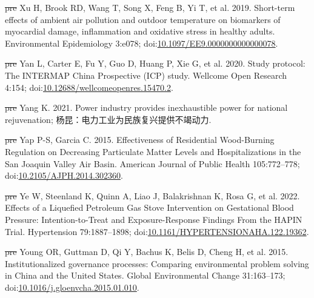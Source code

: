 \documentclass[
  letterpaper,
  DIV=11,
  numbers=noendperiod]{scrartcl}
\newlength{\cslhangindent}
\newenvironment{CSLReferences}[2] %
 {\begin{list}{}{%
  \setlength{\itemindent}{0pt} %
  \setlength{\leftmargin}{0pt} %
  \setlength{\parsep}{0pt} %
  \ifodd #1
   \setlength{\leftmargin}{\cslhangindent} %
   \setlength{\itemindent}{-1\cslhangindent} %
  \fi
  \setlength{\itemsep}{#2\baselineskip}}} %
 {\end{list}} %
\providecommand{\DIFdeltex}[1]{{\protect\color{red}\sout{#1}}}                      %
\providecommand{\DIFaddbegin}{} %
\providecommand{\DIFaddend}{} %
\providecommand{\DIFdelbegin}{} %
\providecommand{\DIFdelend}{} %
\providecommand{\DIFdel}[1]{\texorpdfstring{\DIFdeltex{#1}}{}} %
\newcommand{\DIFscaledelfig}{0.5}
\newlength{\DIFdelgraphicswidth} %
\newlength{\DIFdelgraphicsheight} %
\newcommand{\DIFaddincludegraphics}[2][]{{\color{blue}\fbox{\DIFOincludegraphics[#1]{#2}}}} %
\newcommand{\DIFdelincludegraphics}[2][]{%
\sbox{\DIFdelgraphicsbox}{\DIFOincludegraphics[#1]{#2}}%
\settoboxwidth{\DIFdelgraphicswidth}{\DIFdelgraphicsbox} %
\settoboxtotalheight{\DIFdelgraphicsheight}{\DIFdelgraphicsbox} %
\scalebox{\DIFscaledelfig}{%
\parbox[b]{\DIFdelgraphicswidth}{\usebox{\DIFdelgraphicsbox}\\[-\baselineskip] \rule{\DIFdelgraphicswidth}{0em}}\llap{\resizebox{\DIFdelgraphicswidth}{\DIFdelgraphicsheight}{%
\setlength{\unitlength}{\DIFdelgraphicswidth}%
\begin{picture}(1,1)%
\thicklines\linethickness{2pt} %
{\color[rgb]{1,0,0}\put(0,0){\framebox(1,1){}}}%
{\color[rgb]{1,0,0}\put(0,0){\line( 1,1){1}}}%
{\color[rgb]{1,0,0}\put(0,1){\line(1,-1){1}}}%
\end{picture}%
}\hspace*{3pt}}} %
} %
\DeclareRobustCommand{\DIFaddbegin}{\DIFOaddbegin \let\includegraphics\DIFaddincludegraphics} %
\DeclareRobustCommand{\DIFaddend}{\DIFOaddend \let\includegraphics\DIFOincludegraphics} %
\DeclareRobustCommand{\DIFdelbegin}{\DIFOdelbegin \let\includegraphics\DIFdelincludegraphics} %
\DeclareRobustCommand{\DIFdelend}{\DIFOaddend \let\includegraphics\DIFOincludegraphics} %
\begin{document}
\begin{CSLReferences}{1}{1}
\DIFdelbegin %
\DIFdel{pre}%
\DIFdelend \DIFaddbegin {}
\DIFaddend Xu H, Brook RD, Wang T, Song X, Feng B, Yi T, et al. 2019. Short-term
effects of ambient air pollution and outdoor temperature on biomarkers
of myocardial damage, inflammation and oxidative stress in healthy
adults. Environmental Epidemiology 3:e078;
doi:\href{https://doi.org/10.1097/EE9.0000000000000078}{10.1097/EE9.0000000000000078}.

\DIFdelbegin %
\DIFdel{pre}%
\DIFdelend \DIFaddbegin {}
\DIFaddend Yan L, Carter E, Fu Y, Guo D, Huang P, Xie G, et al. 2020. Study
protocol: {The INTERMAP China Prospective} ({ICP}) study. Wellcome Open
Research 4:154;
doi:\href{https://doi.org/10.12688/wellcomeopenres.15470.2}{10.12688/wellcomeopenres.15470.2}.

\DIFdelbegin %
\DIFdel{pre}%
\DIFdelend \DIFaddbegin {}
\DIFaddend Yang K. 2021. Power industry provides inexhaustible power for national
rejuvenation; 杨昆：电力工业为民族复兴提供不竭动力.

\DIFdelbegin %
\DIFdel{pre}%
\DIFdelend \DIFaddbegin {}
\DIFaddend Yap P-S, Garcia C. 2015. Effectiveness of {Residential Wood-Burning
Regulation} on {Decreasing Particulate Matter Levels} and
{Hospitalizations} in the {San Joaquin Valley Air Basin}. American
Journal of Public Health 105:772--778;
doi:\href{https://doi.org/10.2105/AJPH.2014.302360}{10.2105/AJPH.2014.302360}.

\DIFdelbegin %
\DIFdel{pre}%
\DIFdelend \DIFaddbegin {}
\DIFaddend Ye W, Steenland K, Quinn A, Liao J, Balakrishnan K, Rosa G, et al. 2022.
Effects of a {Liquefied Petroleum Gas Stove Intervention} on
{Gestational Blood Pressure}: {Intention-to-Treat} and
{Exposure-Response Findings From} the {HAPIN Trial}. Hypertension
79:1887--1898;
doi:\href{https://doi.org/10.1161/HYPERTENSIONAHA.122.19362}{10.1161/HYPERTENSIONAHA.122.19362}.

\DIFdelbegin %
\DIFdel{pre}%
\DIFdelend \DIFaddbegin {}
\DIFaddend Young OR, Guttman D, Qi Y, Bachus K, Belis D, Cheng H, et al. 2015.
Institutionalized governance processes: {Comparing} environmental
problem solving in {China} and the {United States}. Global Environmental
Change 31:163--173;
doi:\href{https://doi.org/10.1016/j.gloenvcha.2015.01.010}{10.1016/j.gloenvcha.2015.01.010}.


\end{CSLReferences}
\end{document}
